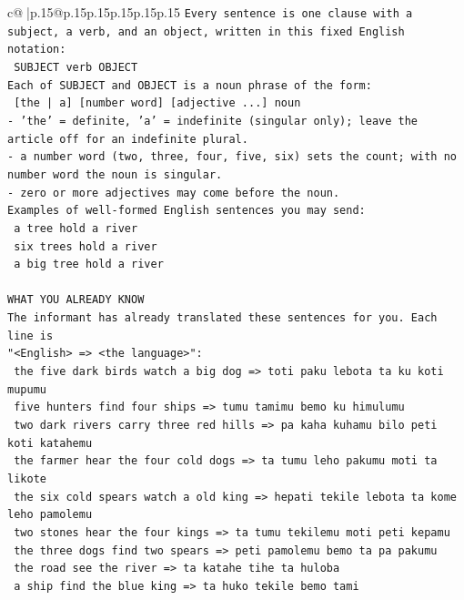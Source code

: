 \documentclass{article}
\begin{document}
{\begin{supertabular}{c@{$\;$}|p{.15\linewidth}@{}p{.15\linewidth}p{.15\linewidth}p{.15\linewidth}p{.15\linewidth}p{.15\linewidth}}
{{{\texttt{Every sentence is one clause with a subject, a verb, and an object, written in this fixed English notation:} \\
\texttt{    SUBJECT  verb  OBJECT} \\
\texttt{Each of SUBJECT and OBJECT is a noun phrase of the form:} \\
\texttt{    {[}the | a{]}  {[}number word{]}  {[}adjective ...{]}  noun} \\
\texttt{{-} 'the' = definite, 'a' = indefinite (singular only); leave the article off for an indefinite plural.} \\
\texttt{{-} a number word (two, three, four, five, six) sets the count; with no number word the noun is singular.} \\
\texttt{{-} zero or more adjectives may come before the noun.} \\
\texttt{Examples of well{-}formed English sentences you may send:} \\
\texttt{    a tree hold a river} \\
\texttt{    six trees hold a river} \\
\texttt{    a big tree hold a river} \\
\\ 
\texttt{WHAT YOU ALREADY KNOW} \\
\texttt{The informant has already translated these sentences for you. Each line is} \\
\texttt{"<English>  =>  <the language>":} \\
\texttt{    the five dark birds watch a big dog  =>  toti paku lebota ta ku koti mupumu} \\
\texttt{    five hunters find four ships  =>  tumu tamimu bemo ku himulumu} \\
\texttt{    two dark rivers carry three red hills  =>  pa kaha kuhamu bilo peti koti katahemu} \\
\texttt{    the farmer hear the four cold dogs  =>  ta tumu leho pakumu moti ta likote} \\
\texttt{    the six cold spears watch a old king  =>  hepati tekile lebota ta kome leho pamolemu} \\
\texttt{    two stones hear the four kings  =>  ta tumu tekilemu moti peti kepamu} \\
\texttt{    the three dogs find two spears  =>  peti pamolemu bemo ta pa pakumu} \\
\texttt{    the road see the river  =>  ta katahe tihe ta huloba} \\
\texttt{    a ship find the blue king  =>  ta huko tekile bemo tami} \\
}}}
\end{supertabular}}
\end{document}
